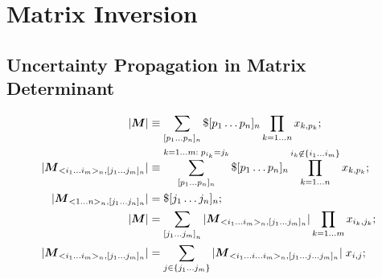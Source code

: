 \documentclass[twoside]{article}
\numberwithin{equation}{section}
\begin{document}
\clearpage
\section{Matrix Inversion}
\label{sec: matrix}


\subsection{Uncertainty Propagation in Matrix Determinant}

\iffalse

\begin{align*}
|\protect{\textrm{\boldmath $M$}}| &\equiv \sum_{[p_1\dots p_n]_n} \$ [p_1\dots p_n]_n \prod_{k=1 \dots n} x_{k,p_{k}}; \\
|\protect{\textrm{\boldmath $M$}}_{<i_1 \dots i_m>_n, [j_1 \dots j_m]_n}| &\equiv \sum_{[p_1 \dots p_n]_n}^{k =1 \dots m:\; p_{i_k}=j_k} \$ [p_1\dots p_n]_n 
	\prod _{k = 1 \dots n }^{i_k \not\in \{i_1 \dots i_m\}} x_{k,p_{k}}; \\
|\protect{\textrm{\boldmath $M$}}_{<1 \dots n>_n, [j_1 \dots j_n]_n}| &= \$ [j_1\dots j_n]_n; \\
|\protect{\textrm{\boldmath $M$}}| &= \sum_{{[j_1 \dots j_m]}_n} |\protect{\textrm{\boldmath $M$}} _{<i_1 \dots i_m>_n, [j_1 \dots j_m]_n}| \prod_{k=1 \dots m} x_{i_k, j_k}; \\
|\protect{\textrm{\boldmath $M$}}_{<i_1 \dots i_m>_n, [j_1 \dots j_m]_n}| &= \sum_{j \in \{j_1 \dots j_m\}} |\protect{\textrm{\boldmath $M$}}_{<i_1 \dots i \dots i_m>_n, [j_1 \dots j \dots j_m]_n}| \;x_{i, j};
\end{align*}
\end{document}
